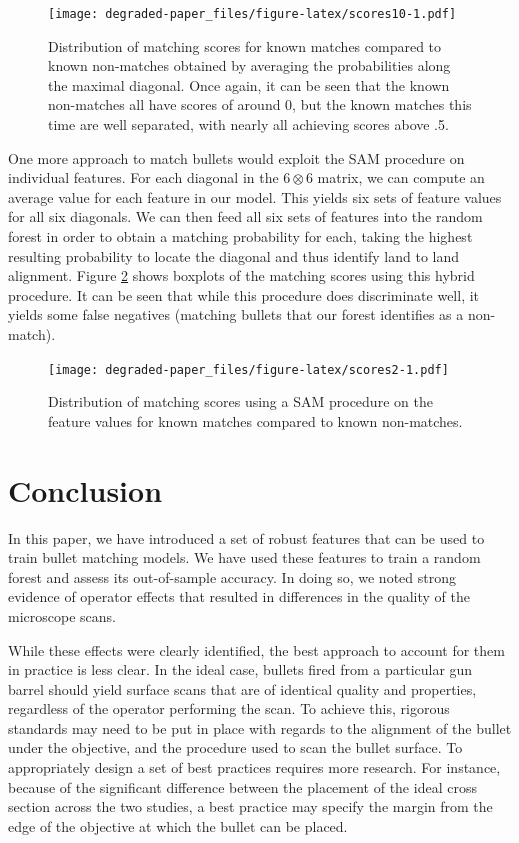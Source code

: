 \documentclass[12pt,]{article}
\theoremstyle{definition}
\theoremstyle{definition}
\theoremstyle{definition}
\theoremstyle{remark}
\begin{document}
\begin{figure}[htbp]
\centering
\texttt{[image: degraded-paper\_files/figure-latex/scores10-1.pdf]}
\caption{\label{fig:scores10}Distribution of matching scores for known
matches compared to known non-matches obtained by averaging the
probabilities along the maximal diagonal. Once again, it can be seen
that the known non-matches all have scores of around 0, but the known
matches this time are well separated, with nearly all achieving scores
above .5.}
\end{figure}

One more approach to match bullets would exploit the SAM procedure on
individual features. For each diagonal in the \(6 \otimes 6\) matrix, we
can compute an average value for each feature in our model. This yields
six sets of feature values for all six diagonals. We can then feed all
six sets of features into the random forest in order to obtain a
matching probability for each, taking the highest resulting probability
to locate the diagonal and thus identify land to land alignment. Figure
\ref{fig:scores2} shows boxplots of the matching scores using this
hybrid procedure. It can be seen that while this procedure does
discriminate well, it yields some false negatives (matching bullets that
our forest identifies as a non-match).

\begin{figure}[htbp]
\centering
\texttt{[image: degraded-paper\_files/figure-latex/scores2-1.pdf]}
\caption{\label{fig:scores2}Distribution of matching scores using a SAM
procedure on the feature values for known matches compared to known
non-matches.}
\end{figure}

\section{Conclusion}\label{conclusion}

In this paper, we have introduced a set of robust features that can be
used to train bullet matching models. We have used these features to
train a random forest and assess its out-of-sample accuracy. In doing
so, we noted strong evidence of operator effects that resulted in
differences in the quality of the microscope scans.

While these effects were clearly identified, the best approach to
account for them in practice is less clear. In the ideal case, bullets
fired from a particular gun barrel should yield surface scans that are
of identical quality and properties, regardless of the operator
performing the scan. To achieve this, rigorous standards may need to be
put in place with regards to the alignment of the bullet under the
objective, and the procedure used to scan the bullet surface. To
appropriately design a set of best practices requires more research. For
instance, because of the significant difference between the placement of
the ideal cross section across the two studies, a best practice may
specify the margin from the edge of the objective at which the bullet
can be placed.
\end{document}
